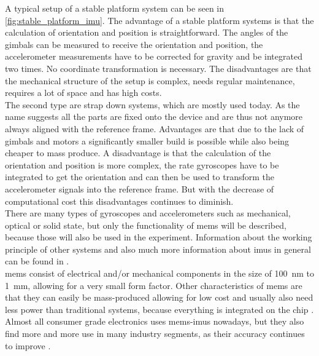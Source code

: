 A typical setup of a stable platform system can be seen in \cref{fig:stable_platform_imu}.
The advantage of a stable platform systems is that the calculation of orientation and position is straightforward.
The angles of the gimbals can be measured to receive the orientation and position, the accelerometer measurements have to be corrected for gravity and be integrated two times.
No coordinate transformation is necessary.
The disadvantages are that the mechanical structure of the setup is complex, needs regular maintenance, requires a lot of space and has high costs.\\
The second type are strap down systems, which are mostly used today.
As the name suggests all the parts are fixed onto the device and are thus not anymore always aligned with the reference frame.
Advantages are that due to the lack of gimbals and motors a significantly smaller build is possible while also being cheaper to mass produce.
A disadvantage is that the calculation of the orientation and position is more complex, the rate gyroscopes have to be integrated to get the orientation and can then be used to transform the accelerometer signals into the reference frame.
But with the decrease of computational cost this disadvantages continues to diminish.\\
There are many types of gyroscopes and accelerometers such as mechanical, optical or solid state, but only the functionality of \gls{mems} will be described, because those will also be used in the experiment.
Information about the working principle of other systems and also much more information about \glspl{imu} in general can be found in \cite{Woodman2007}.\\
\gls{mems} consist of electrical and/or mechanical components in the size of \SI{100}{\nano\metre} to \SI{1}{\milli\metre}, allowing for a very small form factor.
Other characteristics of \gls{mems} are that they can easily be mass-produced allowing for low cost and usually also need less power than traditional systems, because everything is integrated on the chip \cite{Shaeffer2013}.
Almost all consumer grade electronics uses \gls{mems}-\glspl{imu} nowadays, but they also find more and more use in many industry segments, as their accuracy continues to improve \cite{Perlmutter2016}.

